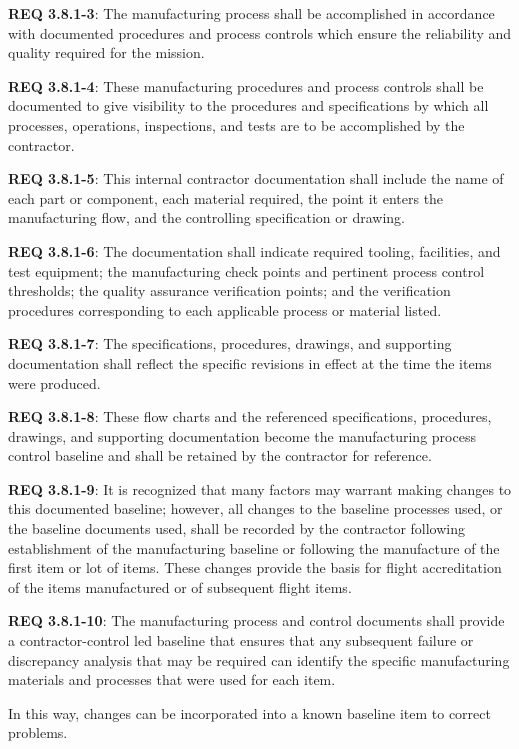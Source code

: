 \documentclass[12pt]{article}
\begin{document}
\noindent \textbf{REQ 3.8.1-3}: The manufacturing process shall be accomplished in accordance with documented procedures and process controls which ensure the reliability and quality required for the mission.

\noindent \textbf{REQ 3.8.1-4}: These manufacturing procedures and process controls shall be documented to give visibility to the procedures and specifications by which all processes, operations, inspections, and tests are to be accomplished by the contractor. 

\noindent \textbf{REQ 3.8.1-5}: This internal contractor documentation shall include the name of each part or component, each material required, the point it enters the manufacturing flow, and the controlling specification or drawing. 

\noindent \textbf{REQ 3.8.1-6}: The documentation shall indicate required tooling, facilities, and test equipment; the manufacturing check points and pertinent process control thresholds; the quality assurance verification points; and the verification procedures corresponding to each applicable process or material listed.

\noindent \textbf{REQ 3.8.1-7}: The specifications, procedures, drawings, and supporting documentation shall reflect the specific revisions in effect at the time the items were produced. 

\noindent \textbf{REQ 3.8.1-8}: These flow charts and the referenced specifications, procedures, drawings, and supporting documentation become the manufacturing process control baseline and shall be retained by the contractor for reference. 

\noindent \textbf{REQ 3.8.1-9}: It is recognized that many factors may warrant making changes to this documented baseline; however, all changes to the baseline processes used, or the baseline documents used, shall be recorded by the contractor following establishment of the manufacturing baseline or following the manufacture of the first item or lot of items. 
These changes provide the basis for flight accreditation of the items manufactured or of subsequent flight items.

\noindent \textbf{REQ 3.8.1-10}: The manufacturing process and control documents shall provide a contractor-control led baseline that ensures that any subsequent failure or discrepancy analysis that may be required can identify the specific manufacturing materials and processes that were used for each item. 

In this way, changes can be incorporated into a known baseline item to correct problems.
\end{document}
